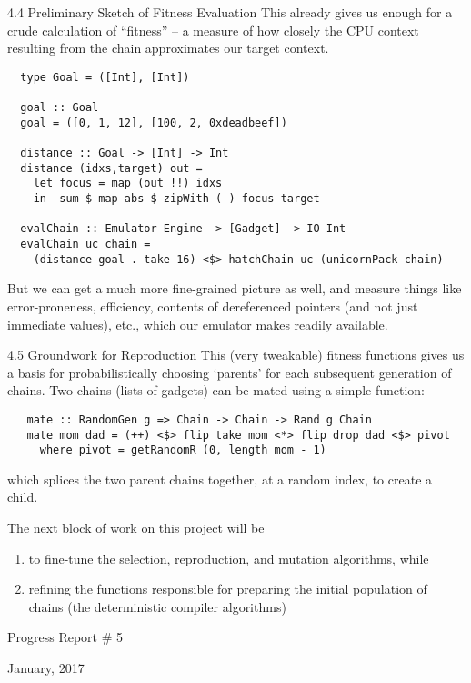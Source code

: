\documentclass[9pt]{beamer}
\begin{document}
\begin{frame}[fragile]{4.4 Preliminary Sketch of Fitness Evaluation}
This already gives us enough for a crude calculation of ``fitness'' -- a measure of how closely the CPU context resulting from the chain approximates our
target context. 
\small
\begin{verbatim}
  type Goal = ([Int], [Int])
 
  goal :: Goal
  goal = ([0, 1, 12], [100, 2, 0xdeadbeef])
 
  distance :: Goal -> [Int] -> Int
  distance (idxs,target) out =
    let focus = map (out !!) idxs
    in  sum $ map abs $ zipWith (-) focus target
 
  evalChain :: Emulator Engine -> [Gadget] -> IO Int
  evalChain uc chain =
    (distance goal . take 16) <$> hatchChain uc (unicornPack chain)
\end{verbatim}
\normal

But we can get a much more fine-grained picture as well, and measure things like error-proneness, efficiency, contents of dereferenced pointers (and not just immediate values), etc., which our emulator makes readily available.

\end{frame}

\begin{frame}[fragile]{4.5 Groundwork for Reproduction}
This (very tweakable) fitness functions gives us a basis for probabilistically choosing `parents' for each subsequent generation of chains. Two chains (lists of gadgets) can be mated using a simple function:
\small
\begin{verbatim}
   mate :: RandomGen g => Chain -> Chain -> Rand g Chain
   mate mom dad = (++) <$> flip take mom <*> flip drop dad <$> pivot
     where pivot = getRandomR (0, length mom - 1)
\end{verbatim}
\normal
which splices the two parent chains together, at a random index, to create a child.

The next block of work on this project will be 
\begin{enumerate} 
\item to 
fine-tune the selection, reproduction, and mutation
algorithms, while
\item refining the functions responsible for preparing the initial population of chains (the deterministic compiler algorithms)
\end{enumerate}
\end{frame}

\begin{frame}
\begin{center}    
    {\huge Progress Report \# 5}
    \vspace{.3cm}
    
    {\large January, 2017}
    \end{center} 
    
\end{frame}
\end{document}
